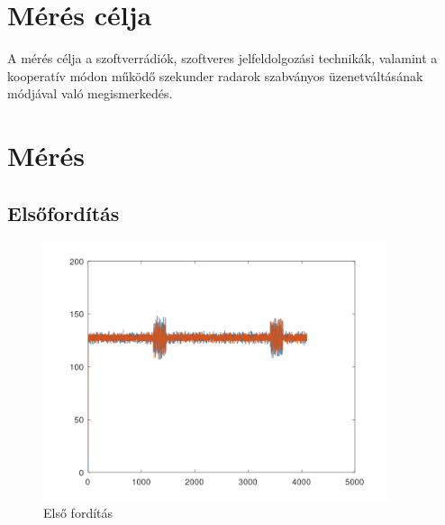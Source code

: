 
\section{Mérés célja}

A mérés célja a szoftverrádiók, szoftveres jelfeldolgozási technikák, valamint a kooperatív
módon működő szekunder radarok szabványos üzenetváltásának módjával való
megismerkedés.

\section{Mérés}

\subsection{Elsőfordítás}
\begin{figure}[h]
    \centering
    \includegraphics[width=0.9\textwidth]{../meres/result/elso_forditas.png}
    \caption{Első fordítás}
    \label{fig:first}
\end{figure}
\newpage
